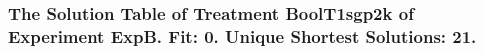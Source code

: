  \begin{frame}
 \fontsize{8pt}{9pt}\selectfont
 \frametitle{ The Solution Table of Treatment BoolT1sgp2k of Experiment ExpB. Fit: 0. Unique Shortest Solutions: 21. }

 \label{ExpBSolutionTable005.tex}  
 \end{frame}

